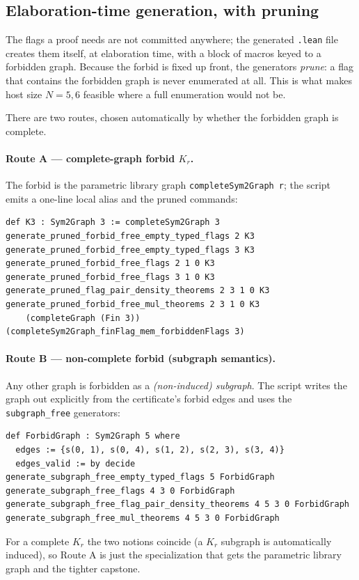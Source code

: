 \documentclass[11pt]{article}
\begin{document}
\subsection{Elaboration-time generation, with pruning}
\label{sec:gen}

The flags a proof needs are not committed anywhere; the generated \texttt{.lean}
file creates them itself, at elaboration time, with a block of macros keyed to a
forbidden graph. Because the forbid is fixed up front, the generators
\emph{prune}: a flag that contains the forbidden graph is never enumerated at
all. This is what makes host size $N=5,6$ feasible where a full enumeration
would not be.

There are two routes, chosen automatically by whether the forbidden graph is
complete.

\paragraph{Route A --- complete-graph forbid $K_r$.}
The forbid is the parametric library graph \texttt{completeSym2Graph r}; the
script emits a one-line local alias and the pruned commands:
\begin{lstlisting}
def K3 : Sym2Graph 3 := completeSym2Graph 3
generate_pruned_forbid_free_empty_typed_flags 2 K3
generate_pruned_forbid_free_empty_typed_flags 3 K3
generate_pruned_forbid_free_flags 2 1 0 K3
generate_pruned_forbid_free_flags 3 1 0 K3
generate_pruned_flag_pair_density_theorems 2 3 1 0 K3
generate_pruned_forbid_free_mul_theorems 2 3 1 0 K3
    (completeGraph (Fin 3)) (completeSym2Graph_finFlag_mem_forbiddenFlags 3)
\end{lstlisting}

\paragraph{Route B --- non-complete forbid (subgraph semantics).}
Any other graph is forbidden as a \emph{(non-induced) subgraph}. The script
writes the graph out explicitly from the certificate's forbid edges and uses the
\texttt{subgraph\_free} generators:
\begin{lstlisting}
def ForbidGraph : Sym2Graph 5 where
  edges := {s(0, 1), s(0, 4), s(1, 2), s(2, 3), s(3, 4)}
  edges_valid := by decide
generate_subgraph_free_empty_typed_flags 5 ForbidGraph
generate_subgraph_free_flags 4 3 0 ForbidGraph
generate_subgraph_free_flag_pair_density_theorems 4 5 3 0 ForbidGraph
generate_subgraph_free_mul_theorems 4 5 3 0 ForbidGraph
\end{lstlisting}
For a complete $K_r$ the two notions coincide (a $K_r$ subgraph is automatically
induced), so Route A is just the specialization that gets the parametric library
graph and the tighter capstone.
\end{document}
